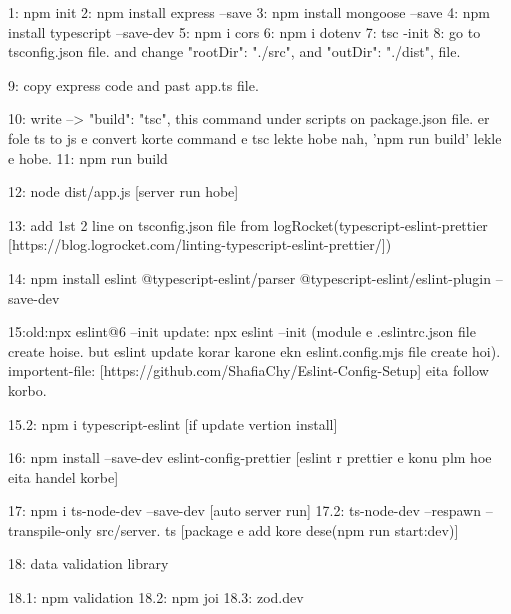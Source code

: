 1: npm init
2: npm install express --save
3: npm install mongoose --save
4: npm install typescript --save-dev
5: npm i cors
6: npm i dotenv
7: tsc -init
8: go to tsconfig.json file. and change "rootDir": "./src", and "outDir": "./dist", file.

9: copy express code and past app.ts file.

10: write --> "build": "tsc", this command under scripts on package.json file. er fole ts to js e convert korte command e tsc lekte hobe nah, 'npm run build' lekle e hobe.
11: npm run build

12: node dist/app.js [server run hobe]

13: add 1st 2 line on tsconfig.json file from logRocket(typescript-eslint-prettier [https://blog.logrocket.com/linting-typescript-eslint-prettier/])

14: npm install eslint @typescript-eslint/parser @typescript-eslint/eslint-plugin --save-dev

15:old:npx eslint@6 --init  update: npx eslint --init  (module e .eslintrc.json file create hoise. but eslint update korar karone ekn eslint.config.mjs file create hoi). importent-file: [https://github.com/ShafiaChy/Eslint-Config-Setup] eita follow korbo.

15.2: npm i typescript-eslint [if update vertion install]

16: npm install --save-dev eslint-config-prettier [eslint r prettier e konu plm hoe eita handel korbe]


17: npm i ts-node-dev --save-dev [auto server run]
17.2: ts-node-dev --respawn --transpile-only src/server.
ts [package e add kore dese(npm run start:dev)]


18: data validation library

18.1: npm validation
18.2: npm joi
18.3: zod.dev